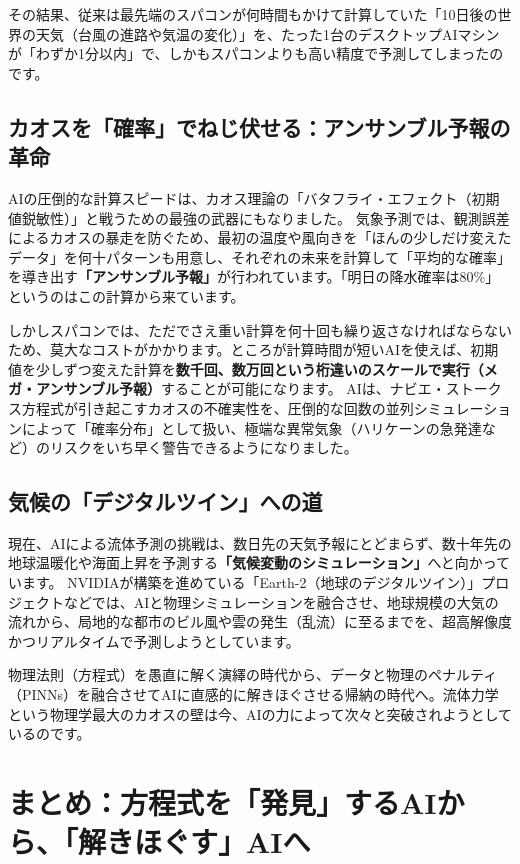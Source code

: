 その結果、従来は最先端のスパコンが何時間もかけて計算していた「10日後の世界の天気（台風の進路や気温の変化）」を、たった1台のデスクトップAIマシンが「わずか1分以内」で、しかもスパコンよりも高い精度で予測してしまったのです。

\subsection{カオスを「確率」でねじ伏せる：アンサンブル予報の革命}

AIの圧倒的な計算スピードは、カオス理論の「バタフライ・エフェクト（初期値鋭敏性）」と戦うための最強の武器にもなりました。 気象予測では、観測誤差によるカオスの暴走を防ぐため、最初の温度や風向きを「ほんの少しだけ変えたデータ」を何十パターンも用意し、それぞれの未来を計算して「平均的な確率」を導き出す\textbf{「アンサンブル予報」}が行われています。「明日の降水確率は80\%」というのはこの計算から来ています。

しかしスパコンでは、ただでさえ重い計算を何十回も繰り返さなければならないため、莫大なコストがかかります。ところが計算時間が短いAIを使えば、初期値を少しずつ変えた計算を\textbf{数千回、数万回という桁違いのスケールで実行（メガ・アンサンブル予報）}することが可能になります。 AIは、ナビエ・ストークス方程式が引き起こすカオスの不確実性を、圧倒的な回数の並列シミュレーションによって「確率分布」として扱い、極端な異常気象（ハリケーンの急発達など）のリスクをいち早く警告できるようになりました。

\subsection{気候の「デジタルツイン」への道}

現在、AIによる流体予測の挑戦は、数日先の天気予報にとどまらず、数十年先の地球温暖化や海面上昇を予測する\textbf{「気候変動のシミュレーション」}へと向かっています。 NVIDIAが構築を進めている「Earth-2（地球のデジタルツイン）」プロジェクトなどでは、AIと物理シミュレーションを融合させ、地球規模の大気の流れから、局地的な都市のビル風や雲の発生（乱流）に至るまでを、超高解像度かつリアルタイムで予測しようとしています。

物理法則（方程式）を愚直に解く演繹の時代から、データと物理のペナルティ（PINNs）を融合させてAIに直感的に解きほぐさせる帰納の時代へ。流体力学という物理学最大のカオスの壁は今、AIの力によって次々と突破されようとしているのです。

\section{まとめ：方程式を「発見」するAIから、「解きほぐす」AIへ}

